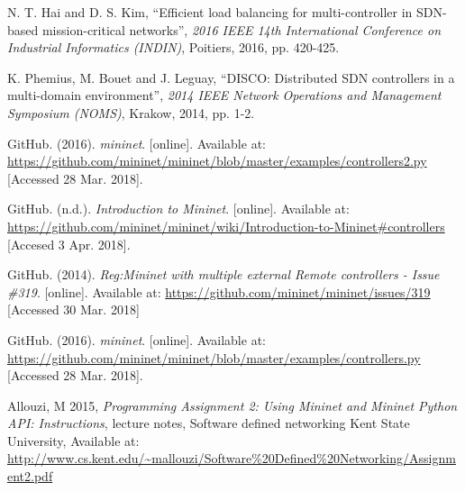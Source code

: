\documentclass[12pt, a4paper]{article}
\begin{document}




\begin{thebibliography}{99}
  \footnotesize

  N. T. Hai and D. S. Kim,
  ``Efficient load balancing for multi-controller in SDN-based mission-critical networks'',
  \textit{2016 IEEE 14th International Conference on Industrial Informatics (INDIN)},
  Poitiers,
  2016,
  pp. 420-425.

  K. Phemius, M. Bouet and J. Leguay,
  ``DISCO: Distributed SDN controllers in a multi-domain environment'',
  \textit{2014 IEEE Network Operations and Management Symposium (NOMS)},
  Krakow,
  2014,
  pp. 1-2.

  GitHub. (2016).
  \textit{mininet}. [online].
  Available at: {\scriptsize \url{https://github.com/mininet/mininet/blob/master/examples/controllers2.py}}
  [Accessed 28 Mar. 2018].

  GitHub. (n.d.).
  \textit{Introduction to Mininet}. [online].
  Available at: {\scriptsize \url{https://github.com/mininet/mininet/wiki/Introduction-to-Mininet#controllers}}
  [Accesed 3 Apr. 2018].

  GitHub. (2014).
  \textit{Reg:Mininet with multiple external Remote controllers - Issue \#319}. [online].
  Available at: {\scriptsize \url{https://github.com/mininet/mininet/issues/319}}
  [Accessed 30 Mar. 2018]

  GitHub. (2016).
  \textit{mininet}. [online].
  Available at: {\scriptsize \url{https://github.com/mininet/mininet/blob/master/examples/controllers.py}}
  [Accessed 28 Mar. 2018].

  Allouzi, M 2015,
  \textit{Programming Assignment 2: Using Mininet and Mininet Python API: Instructions},
  lecture notes,
  Software defined networking Kent State University,
  Available at: {\scriptsize \url{http://www.cs.kent.edu/~mallouzi/Software%20Defined%20Networking/Assignment2.pdf}}



\end{thebibliography}
\end{document}
